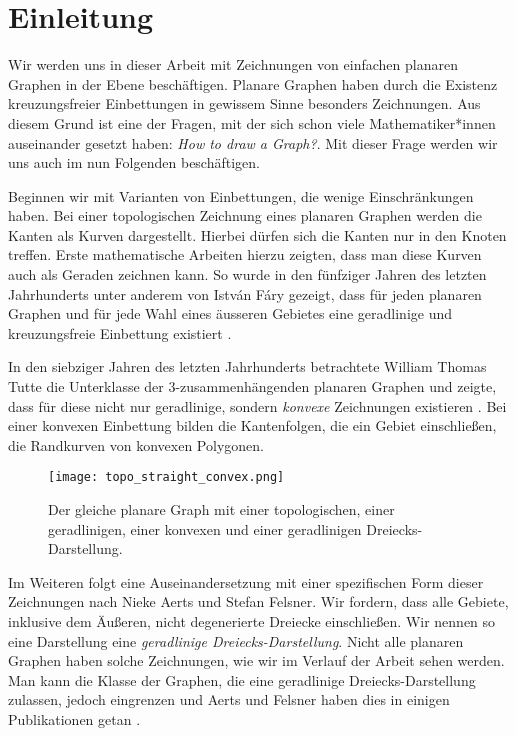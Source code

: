 \chapter{Einleitung}
Wir werden uns in dieser Arbeit mit Zeichnungen von einfachen planaren Graphen in der Ebene beschäftigen. Planare Graphen haben durch die Existenz kreuzungsfreier Einbettungen in gewissem Sinne besonders \grqq{ } Zeichnungen. Aus diesem Grund ist eine der Fragen, mit der sich schon viele Mathematiker*innen auseinander gesetzt haben: \glqq\textit{How to draw a Graph?}\grqq\cite{tutte63}. Mit dieser Frage werden wir uns auch im nun Folgenden beschäftigen. 

Beginnen wir mit Varianten von Einbettungen, die wenige Einschränkungen haben. Bei einer topologischen Zeichnung eines planaren Graphen werden die Kanten als Kurven dargestellt. Hierbei dürfen sich die Kanten nur in den Knoten treffen. Erste mathematische Arbeiten hierzu zeigten, dass man diese Kurven auch als Geraden zeichnen kann. So wurde in den fünfziger Jahren des letzten Jahrhunderts unter anderem von István Fáry gezeigt, dass für jeden planaren Graphen und für jede Wahl eines äusseren Gebietes eine geradlinige und kreuzungsfreie Einbettung existiert \cite{fary48}.

In den siebziger Jahren des letzten Jahrhunderts betrachtete William Thomas Tutte die Unterklasse der 3-zusam\-men\-hängenden planaren Graphen und zeigte, dass für diese nicht nur geradlinige, sondern \textit{konvexe} Zeichnungen existieren \cite{tutte63}. Bei einer konvexen Einbettung bilden die Kantenfolgen, die ein Gebiet einschließen, die Randkurven von konvexen Polygonen.

\begin{figure}[h]
	\centering
  \texttt{[image: topo\_straight\_convex.png]}
	\caption{Der gleiche planare Graph mit einer topologischen, einer ge\-rad\-lini\-gen, einer konvexen und einer geradlinigen Dreiecks-Darstellung.}
	\label{topo_straight_convex}
\end{figure}

Im Weiteren folgt eine Auseinandersetzung mit einer spezifischen Form dieser Zeichnungen nach Nieke Aerts und Stefan Felsner. Wir fordern, dass alle Gebiete, inklusive dem Äußeren, nicht degenerierte Dreiecke einschließen. Wir nennen so eine Darstellung eine \textit{geradlinige Dreiecks-Darstellung}. Nicht alle planaren Graphen haben solche Zeichnungen, wie wir im Verlauf der Arbeit sehen werden. Man kann die Klasse der Graphen, die eine geradlinige Dreiecks-Darstellung zulassen, jedoch eingrenzen und Aerts und Felsner haben dies in einigen Publikationen getan \cite{af13h,af13,af15}.

